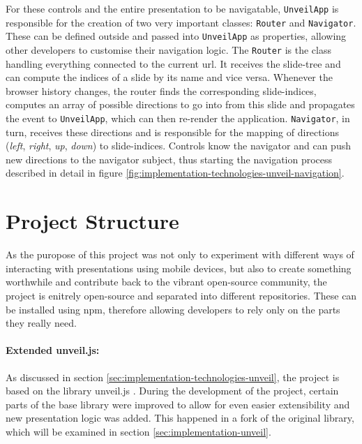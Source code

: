 For these controls and the entire presentation to be navigatable, \texttt{Un\-veil\-App} is responsible for the creation of two very important classes: \texttt{Router} and \texttt{Navigator}. These can be defined outside and passed into \texttt{UnveilApp} as properties, allowing other developers to customise their navigation logic.
%
The \texttt{Router} is the class handling everything connected to the current url. It receives the slide-tree and can compute the indices of a slide by its name and vice versa. Whenever the browser history changes, the router finds the corresponding slide-indices, computes an array of possible directions to go into from this slide and propagates the event to \texttt{UnveilApp}, which can then re-render the application.
\texttt{Navigator}, in turn, receives these directions and is responsible for the mapping of directions (\emph{left}, \emph{right}, \emph{up}, \emph{down}) to slide-indices. Controls know the navigator and can push new directions to the navigator subject, thus starting the navigation process described in detail in figure \ref{fig:implementation-technologies-unveil-navigation}.

\section{Project Structure}
\label{sec:implementation-structure}

As the puropose of this project was not only to experiment with different ways of interacting with presentations using mobile devices, but also to create something worthwhile and contribute back to the vibrant open-source community, the project is enitrely open-source and separated into different repositories. These can be installed using npm, therefore allowing developers to rely only on the parts they really need.

\paragraph{Extended unveil.js:} As discussed in section \ref{sec:implementation-technologies-unveil}, the project is based on the library unveil.js \cite{unveil}. During the development of the project, certain parts of the base library were improved to allow for even easier extensibility and new presentation logic was added. This happened in a fork of the original library, which will be examined in section \ref{sec:implementation-unveil}.

